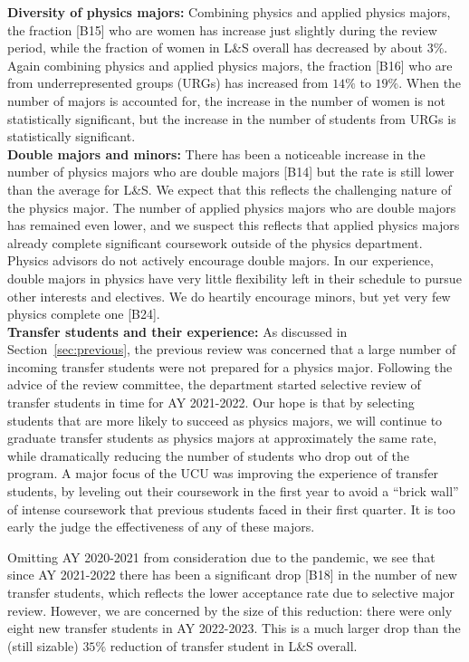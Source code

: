 \documentclass[12pt]{article}
\begin{document}
\noindent
{\bf Diversity of physics majors:}
Combining physics and applied physics majors, the fraction [B15] who
are women has increase just slightly during the review period, while
the fraction of women in L\&S overall has decreased by about $3\%$.
Again combining physics and applied physics majors, the fraction [B16]
who are from underrepresented groups (URGs) has increased from $14\%$
to $19\%$.  When the number of majors is accounted for, the increase
in the number of women is not statistically significant, but the
increase in the number of students from URGs is statistically
significant.\\[3pt]

\noindent
{\bf Double majors and minors:}
There has been a noticeable increase in the number of physics majors
who are double majors [B14] but the rate is still lower than the
average for L\&S.  We expect that this reflects the challenging nature
of the physics major.  The number of applied physics majors who are
double majors has remained even lower, and we suspect this reflects
that applied physics majors already complete significant coursework
outside of the physics department.  Physics advisors do not actively
encourage double majors.  In our experience, double majors in physics
have very little flexibility left in their schedule to pursue other
interests and electives.  We do heartily encourage minors, but yet
very few physics complete one [B24].\\[3pt]

\noindent
{\bf Transfer students and their experience:}
As discussed in Section~\ref{sec:previous}, the previous review was
concerned that a large number of incoming transfer students were not
prepared for a physics major.  Following the advice of the review
committee, the department started selective review of transfer
students in time for AY 2021-2022.  Our hope is that by selecting
students that are more likely to succeed as physics majors, we will
continue to graduate transfer students as physics majors at
approximately the same rate, while dramatically reducing the number of
students who drop out of the program.  A major focus of the UCU was
improving the experience of transfer students, by leveling out their
coursework in the first year to avoid a ``brick wall'' of intense
coursework that previous students faced in their first quarter.  It is
too early the judge the effectiveness of any of these majors.

Omitting AY 2020-2021 from consideration due to the pandemic, we see
that since AY 2021-2022 there has been a significant drop [B18] in the
number of new transfer students, which reflects the lower acceptance
rate due to selective major review.  However, we are concerned by the
size of this reduction: there were only eight new transfer students in
AY 2022-2023.  This is a much larger drop than the (still sizable)
$35\%$ reduction of transfer student in L\&S overall.
\end{document}
